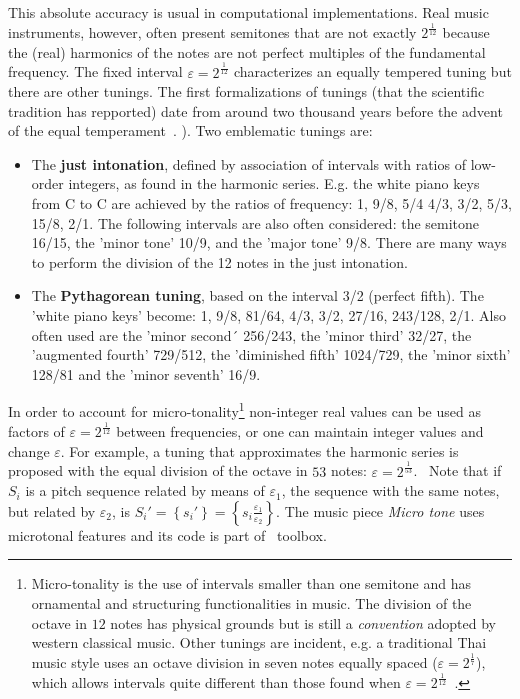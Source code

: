 This absolute accuracy is usual in computational implementations. Real music instruments, however, often present semitones that are not exactly $2^{\frac{1}{12}}$ because the (real) harmonics of the notes are not perfect multiples of the fundamental frequency. The fixed interval $\varepsilon=2^{\frac{1}{12}}$ characterizes an equally tempered tuning but there are other tunings. The first formalizations of tunings (that the scientific tradition has repported) date from around two thousand years before the advent of the equal temperament~\cite{Roederer}.
). Two emblematic tunings are:
\begin{itemize}
    \item The {\bf just intonation}, defined by association of intervals with ratios of low-order integers, as found in the harmonic series. E.g. the white piano keys from C to C are achieved by the ratios of frequency: 1, 9/8, 5/4
    4/3, 3/2, 5/3, 15/8, 2/1. The following intervals are also often considered: the semitone 16/15, the 'minor tone' 10/9, and the 'major tone' 9/8. There are many ways to perform the division of the 12 notes in the just intonation.
    \item The {\bf Pythagorean tuning}, based on the interval 3/2 (perfect fifth). The 'white piano keys' become: 1, 9/8, 81/64, 4/3, 3/2, 27/16, 243/128, 2/1. Also often used are the 'minor second´ 256/243, the 'minor third' 32/27, the 'augmented fourth' 729/512, the 'diminished fifth' 1024/729, the 'minor sixth' 128/81 and the 'minor seventh' 16/9. 
\end{itemize}

In order to account for micro-tonality\footnote{Micro-tonality is the use of intervals smaller
than one semitone and has ornamental and structuring functionalities in music. The division of the octave in $12$ notes has physical grounds but is still a \emph{convention} adopted by western classical music. Other tunings are incident, e.g. a traditional Thai music style uses an octave division in seven notes equally spaced ($\varepsilon=2^{\frac{1}{7}}$),
which allows intervals quite different than those found when $\varepsilon=2^{\frac{1}{12}}$~\cite{Wisnick}.} non-integer real values can be used as factors of $\varepsilon=2^{\frac{1}{12}}$ between frequencies, or one can maintain integer values and change $\varepsilon$. For example, a tuning that approximates the harmonic series
is proposed with the equal division of the octave in $53$ notes:
$\varepsilon=2^{\frac{1}{53}}$.~\cite{microtonalidade}
Note that if $S_i$ is a pitch sequence related by means of $\varepsilon_1$, the sequence with the same notes, but related by $\varepsilon_2$, is 
$S_i'=\left\{s_i'\right\}=\left\{
s_i \frac{\varepsilon_1}{\varepsilon_2}\right\}$. The music piece \emph{Micro
tone} uses microtonal features and its code
is part of \massa\ toolbox.

